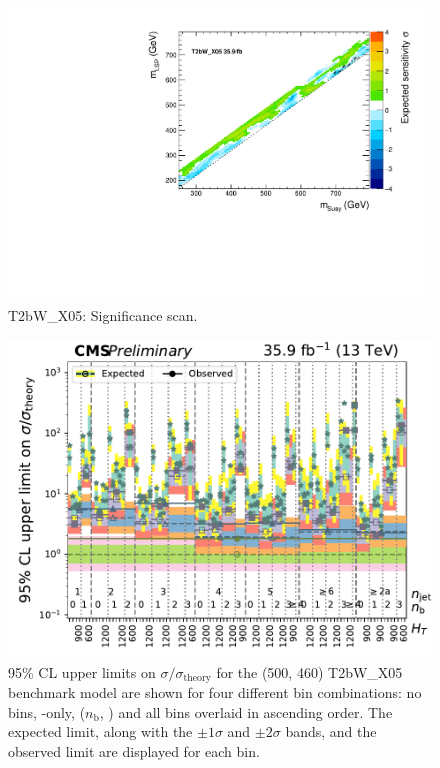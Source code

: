 \begin{figure}[htbp]
\centering
\includegraphics[width=110mm]{./sec31/T2bW/finalCanvasObsSignif.pdf}
\caption{T2bW\_X05: Significance scan.}
\end{figure}

\begin{figure}[htbp]
\centering
\includegraphics[width=120mm]{./sec31/T2bW/SMS-T2bW_X05_mStop-500_mLSP-460_25ns_limits_nj_nb_ht.pdf}
\caption{95\% CL upper limits on $\sigma / \sigma_{\mathrm{theory}}$ for the (500, 460) T2bW\_X05 benchmark model are shown for four different bin combinations: no bins, \HT-only, ($n_{\mathrm{b}}$, \HT) and all bins overlaid in ascending order. The expected limit, along with the $\pm 1 \sigma$ and $\pm 2 \sigma$ bands, and the observed limit are displayed for each bin.}
\end{figure}


